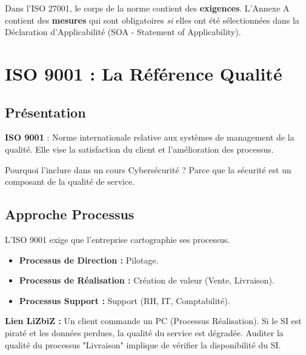 \begin{boxalert}
Dans l'ISO 27001, le corps de la norme contient des \textbf{exigences}. L'Annexe A contient des \textbf{mesures} qui sont obligatoires \textit{si} elles ont été sélectionnées dans la Déclaration d'Applicabilité (SOA - Statement of Applicability).
\end{boxalert}

\section{ISO 9001 : La Référence Qualité}

\subsection{Présentation}

\begin{boxdef}
\textbf{ISO 9001} : Norme internationale relative aux systèmes de management de la qualité. Elle vise la satisfaction du client et l'amélioration des processus.
\end{boxdef}

Pourquoi l'inclure dans un cours Cybersécurité ? Parce que la sécurité est un composant de la qualité de service.

\subsection{Approche Processus}

L'ISO 9001 exige que l'entreprise cartographie ses processus.
\begin{itemize}
    \item \textbf{Processus de Direction :} Pilotage.
    \item \textbf{Processus de Réalisation :} Création de valeur (Vente, Livraison).
    \item \textbf{Processus Support :} Support (RH, IT, Comptabilité).
\end{itemize}

\begin{boxlizbiz}
\textbf{Lien LiZbiZ :}
Un client commande un PC (Processus Réalisation). Si le SI est piraté et les données perdues, la qualité du service est dégradée. Auditer la qualité du processus "Livraison" implique de vérifier la disponibilité du SI.
\end{boxlizbiz}

